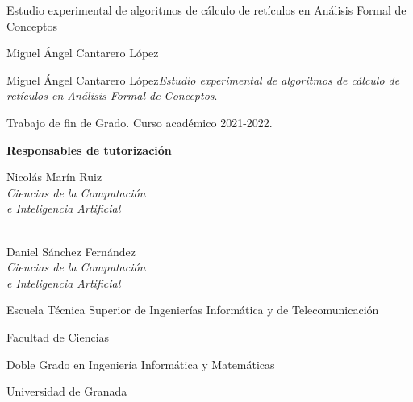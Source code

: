 

\newcommand{\miTitulo}{Estudio experimental de algoritmos de cálculo de retículos en Análisis Formal de Conceptos\xspace}
\newcommand{\miNombre}{Miguel Ángel Cantarero López\xspace}
\newcommand{\miGrado}{Doble Grado en Ingeniería Informática y Matemáticas}
\newcommand{\miFacultadC}{Facultad de Ciencias}
\newcommand{\miFacultadI}{Escuela Técnica Superior de Ingenierías Informática y de Telecomunicación}
\newcommand{\miUniversidad}{Universidad de Granada}
\newcommand{\miTutorI}{
  Nicolás Marín Ruiz \\ \emph{Ciencias de la Computación}\\ \emph{e Inteligencia Artificial} 
}
\newcommand{\miTutorC}{
  Daniel Sánchez Fernández \\ \emph{Ciencias de la Computación}\\ \emph{e Inteligencia Artificial} 
}
\newcommand{\miCurso}{2021-2022\xspace}

\thispagestyle{empty}

\begin{center}
  \large


  \begingroup
  \huge{\miTitulo} \\ \bigskip
  \endgroup

  \textrm{\miNombre}


\end{center}

\newpage
\thispagestyle{empty}

\hfill

\vfill

\noindent\miNombre \textit{\miTitulo}.

Trabajo de fin de Grado. Curso académico \miCurso.

\begin{minipage}[t]{0.25\textwidth}
  \flushleft
  \textbf{Responsables de tutorización}
\end{minipage}
\begin{minipage}[t]{0.45\textwidth}
  \flushleft
  \miTutorI
  \medskip \\
  \miTutorC
\end{minipage}
\begin{minipage}[t]{0.30\textwidth}
  \flushright

  \miFacultadI
  \medskip

  \miFacultadC
  \medskip \medskip
  
  \miGrado
  \medskip
  
  \miUniversidad
\end{minipage}
\begin{flushleft}
\end{flushleft}

\endinput
